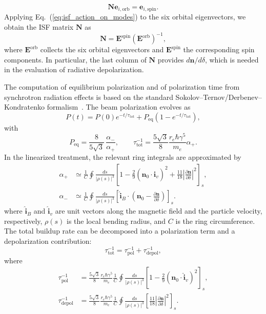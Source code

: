 \documentclass[a4paper,
               biblatex,     %
               hyphens,      %
               ]{jacow}
\begin{document}
\begin{equation}
\mathbf{N}\bm{e}_{i,\mathrm{orb}} = \bm{e}_{i,\mathrm{spin}}.
\label{eq:isf_action_on_modes}
\end{equation}
Applying Eq.~(\ref{eq:isf_action_on_modes}) to the six orbital eigenvectors, we obtain the ISF matrix $\mathbf{N}$ as
\begin{equation}
\mathbf{N} = \mathbf{E}^{\mathrm{spin}}\left(\mathbf{E}^{\mathrm{orb}}\right)^{-1},
\label{eq:isf_matrix_from_eigenvectors}
\end{equation}
where $\mathbf{E}^{\mathrm{orb}}$ collects the six orbital eigenvectors and $\mathbf{E}^{\mathrm{spin}}$ the corresponding spin components. In particular, the last column of $\mathbf{N}$ provides $d\bm{n}/d\delta$, which is needed in the evaluation of radiative depolarization.

The computation of equilibrium polarization and of polarization time from synchrotron radiation effects is based on the standard Sokolov--Ternov/Derbenev--Kondratenko formalism~\cite{Derbenev:1973ia,Boge:1994we,Mane:1986qy,Barber:1999xm}. The beam polarization evolves as
\begin{equation}
P(t) = P(0)e^{-t/\tau_{\mathrm{tot}}} + P_{\mathrm{eq}}
\left(1 - e^{-t/\tau_{\mathrm{tot}}}\right),
\end{equation}
with
\begin{equation}
P_{\mathrm{eq}} = \frac{8}{5\sqrt{3}}\,\frac{\alpha_-}{\alpha_+},
\qquad
\tau_{\mathrm{tot}}^{-1} = \frac{5\sqrt{3}}{8}\frac{r_e\hbar\gamma^5}{m_e}\alpha_+.
\end{equation}
In the linearized treatment, the relevant ring integrals are approximated by
\begin{align}
\alpha_+ &\simeq \frac{1}{C}\oint \frac{ds}{|\rho(s)|^3}
\left[1 - \frac{2}{9}(\bm{n}_0 \cdot \hat{\bm{i}}_v)^2
+ \frac{11}{18}\left|\frac{\partial \bm{n}}{\partial \delta}\right|^2\right]_s, \\
\alpha_- &\simeq \frac{1}{C}\oint \frac{ds}{|\rho(s)|^3}
\left[\hat{\bm{i}}_B \cdot
\left(\bm{n}_0 - \frac{\partial \bm{n}}{\partial \delta}\right)\right]_s.
\end{align}
where $\hat{\bm{i}}_B$ and $\hat{\bm{i}}_v$ are unit vectors along the magnetic field and the particle velocity, respectively, $\rho(s)$ is the local bending radius, and $C$ is the ring circumference.
The total buildup rate can be decomposed into a polarization term and a depolarization contribution:
\begin{equation}
\tau_{\mathrm{tot}}^{-1} = \tau_{\mathrm{pol}}^{-1} + \tau_{\mathrm{depol}}^{-1},
\end{equation}
where
\begin{align}
\tau_{\mathrm{pol}}^{-1} &= \frac{5\sqrt{3}}{8}\frac{r_e\hbar\gamma^5}{m_e}\frac{1}{C}
\oint \frac{ds}{|\rho(s)|^3}
\left[1 - \frac{2}{9}(\bm{n}_0 \cdot \hat{\bm{i}}_v)^2\right]_s, \\
\tau_{\mathrm{depol}}^{-1} &= \frac{5\sqrt{3}}{8}\frac{r_e\hbar\gamma^5}{m_e}\frac{1}{C}
\oint \frac{ds}{|\rho(s)|^3}
\left[\frac{11}{18}\left|\frac{\partial \bm{n}}{\partial \delta}\right|^2\right]_s.
\end{align}
\end{document}
